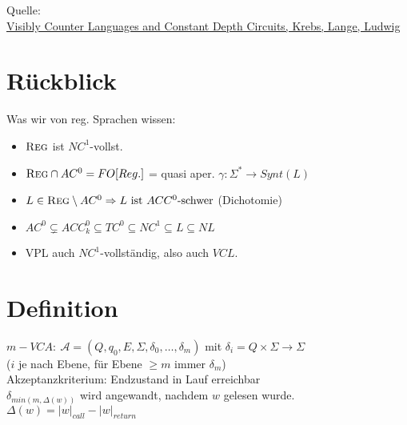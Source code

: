 Quelle:\\ \href{http://drops.dagstuhl.de/opus/volltexte/2015/4944/pdf/44.pdf}{Visibly Counter Languages and Constant Depth Circuits, Krebs, Lange, Ludwig}
\section{Rückblick}
    Was wir von reg. Sprachen wissen:
    \begin{itemize}
        \item $\textsc{Reg}$ ist $NC^1$-vollst.
        \item $\textsc{Reg}\cap AC^0 = FO[Reg.]$
        	= quasi aper. $\gamma:\Sigma^*\to Synt(L)$
        \item $L\in \textsc{Reg}\setminus AC^0 \Rightarrow L \text{ ist } ACC^0 \text{-schwer}$ (Dichotomie)
        \item $AC^0 \subsetneq ACC_k^0 \subseteq TC^0 \subseteq NC^1 \subseteq L \subseteq NL$\\[1mm]
        \item VPL auch $NC^1$-vollständig, also auch $VCL$.
    \end{itemize}
\section{Definition}
    $m-VCA:\ \mathcal{A} = (Q, q_0, E, \Sigma, \delta_0, \dots, \delta_m)$ mit $\delta_i = Q \times \Sigma \to \Sigma$ \\($i$ je nach Ebene, für Ebene $\geq m$ immer $\delta_m$)\\[2mm]
    Akzeptanzkriterium: Endzustand in Lauf erreichbar\\
    $\delta_{min(m, \Delta(w))}$ wird angewandt, nachdem $w$ gelesen wurde. $\Delta(w) = |w|_{call} - |w|_{return}$\\
